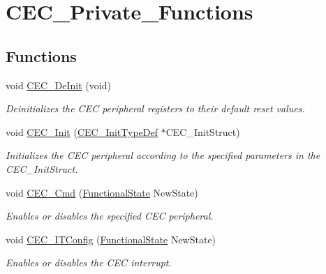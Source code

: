 \hypertarget{group___c_e_c___private___functions}{}\section{C\+E\+C\+\_\+\+Private\+\_\+\+Functions}
\label{group___c_e_c___private___functions}
\subsection*{Functions}
\begin{DoxyCompactItemize}
\item 
void \mbox{\hyperlink{group___c_e_c___private___functions_ga604c3b15b51a46303c201fa3deac2212}{C\+E\+C\+\_\+\+De\+Init}} (void)
\begin{DoxyCompactList}\small\item\em Deinitializes the C\+EC peripheral registers to their default reset values. \end{DoxyCompactList}\item 
void \mbox{\hyperlink{group___c_e_c___private___functions_gaf48aee745a16370372b3eaa7cf3ed22b}{C\+E\+C\+\_\+\+Init}} (\mbox{\hyperlink{struct_c_e_c___init_type_def}{C\+E\+C\+\_\+\+Init\+Type\+Def}} $\ast$C\+E\+C\+\_\+\+Init\+Struct)
\begin{DoxyCompactList}\small\item\em Initializes the C\+EC peripheral according to the specified parameters in the C\+E\+C\+\_\+\+Init\+Struct. \end{DoxyCompactList}\item 
void \mbox{\hyperlink{group___c_e_c___private___functions_ga0c8efa79e5768930e567b3b3ed6e09e9}{C\+E\+C\+\_\+\+Cmd}} (\mbox{\hyperlink{group___exported__types_gac9a7e9a35d2513ec15c3b537aaa4fba1}{Functional\+State}} New\+State)
\begin{DoxyCompactList}\small\item\em Enables or disables the specified C\+EC peripheral. \end{DoxyCompactList}\item 
void \mbox{\hyperlink{group___c_e_c___private___functions_ga8be87c514505cf82eb29334f054fc0bc}{C\+E\+C\+\_\+\+I\+T\+Config}} (\mbox{\hyperlink{group___exported__types_gac9a7e9a35d2513ec15c3b537aaa4fba1}{Functional\+State}} New\+State)
\begin{DoxyCompactList}\small\item\em Enables or disables the C\+EC interrupt. \end{DoxyCompactList}\item 

\end{DoxyCompactItemize}
